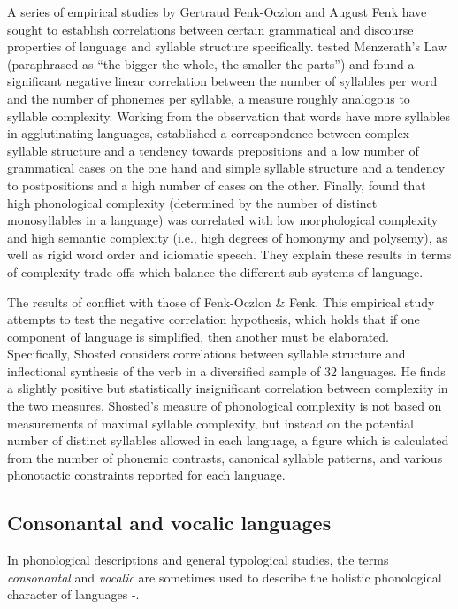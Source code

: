   A series of empirical studies by Gertraud Fenk-Oczlon and August Fenk have sought to establish correlations between certain grammatical and discourse properties of language and syllable structure specifically. \citet{FenkFenkOczlon1993} tested Menzerath’s Law (paraphrased as “the bigger the whole, the smaller the parts”) and found a significant negative linear correlation between the number of syllables per word and the number of phonemes per syllable, a measure roughly analogous to syllable complexity. Working from the observation that words have more syllables in agglutinating languages, \citet{FenkOczlonFenk2005} established a correspondence between complex syllable structure and a tendency towards prepositions and a low number of grammatical cases on the one hand and simple syllable structure and a tendency to postpositions and a high number of cases on the other. Finally, \citet{FenkOczlonFenk2008} found that high phonological complexity (determined by the number of distinct monosyllables in a language) was correlated with low morphological complexity and high semantic complexity (i.e., high degrees of homonymy and polysemy), as well as rigid word order and idiomatic speech. They explain these results in terms of complexity trade-offs which balance the different sub-systems of language.

  The results of \citet{Shosted2006} conflict with those of Fenk-Oczlon \& Fenk. This empirical study attempts to test the negative correlation hypothesis, which holds that if one component of language is simplified, then another must be elaborated. Specifically, Shosted considers correlations between syllable structure and inflectional synthesis of the verb in a diversified sample of 32 languages. He finds a slightly positive but statistically insignificant correlation between complexity in the two measures. Shosted’s measure of phonological complexity is not based on measurements of maximal syllable complexity, but instead on the potential number of distinct syllables allowed in each language, a figure which is calculated from the number of phonemic contrasts, canonical syllable patterns, and various phonotactic constraints reported for each language.

\subsection{Consonantal and vocalic languages}\label{sec:1.3.3}

  In phonological descriptions and general typological studies, the terms \textit{consonantal} and \textit{vocalic} are sometimes used to describe the holistic phonological character of languages -.

